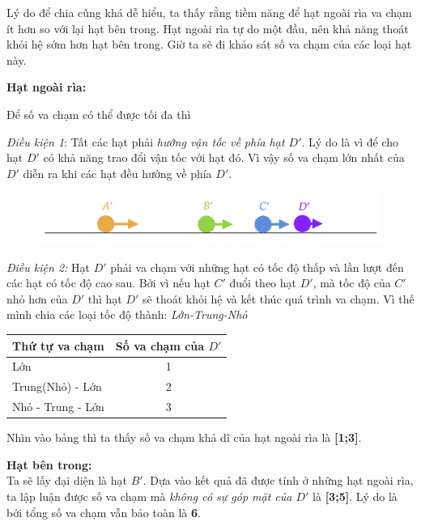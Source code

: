 \begin{enumerate}
Lý do để chia cũng khá dễ hiểu, ta thấy rằng tiềm năng để hạt ngoài rìa va chạm ít hơn so với lại hạt bên trong. Hạt ngoài rìa tự do một đầu, nên khả năng thoát khỏi hệ sớm hơn hạt bên trong. Giờ ta sẽ đi khảo sát số va chạm của các loại hạt này.

\textbf{Hạt ngoài rìa:}

Để số va chạm có thể được tối đa thì

\textit{Điều kiện 1}: Tất các hạt phải \textit{hướng vận tốc về phía hạt $D'$}. Lý do là vì để cho hạt $D'$ có khả năng trao đổi vận tốc với hạt đó. Vì vậy số va chạm lớn nhất của $D'$ diễn ra khi các hạt đều hướng về phía $D'$.
\begin{figure}[ht]
    \centering
    \includegraphics[scale=0.6]{Problem_1/Image/S2.2.4.png}
    \caption{}
    \label{S2.2.4}
\end{figure}

\textit{Điều kiện 2:} Hạt $D'$ phải va chạm với những hạt có tốc độ thấp và lần lượt đến các hạt có tốc độ cao sau. Bởi vì nếu hạt $C'$ đuổi theo hạt $D'$, mà tốc độ của $C'$ nhỏ hơn của $D'$ thì hạt $D'$ sẽ thoát khỏi hệ và kết thúc quá trình va chạm. Vì thế mình chia các loại tốc độ thành: \textit{Lớn-Trung-Nhỏ}

\begin{center}
\begin{tabular}{|l|c|}
\hline
Thứ tự va chạm    & Số va chạm của $D'$ \\ \hline
Lớn               & 1                   \\ \hline
Trung(Nhỏ) - Lớn  & 2                   \\ \hline
Nhỏ - Trung - Lớn & 3                   \\ \hline
\end{tabular}
\end{center}


Nhìn vào bảng thì ta thấy số va chạm khả dĩ của hạt ngoài rìa là \textbf{[1;3]}.

\textbf{Hạt bên trong:}
\\
Ta sẽ lấy đại diện là hạt $B'$. Dựa vào kết quả đã được tính ở những hạt ngoài rìa, ta lập luận được số va chạm mà \textit{không có sự góp mặt của $D'$} là \textbf{[3;5]}. Lý do là bởi tổng số va chạm vẫn bảo toàn là \textbf{6}.


\end{enumerate}
